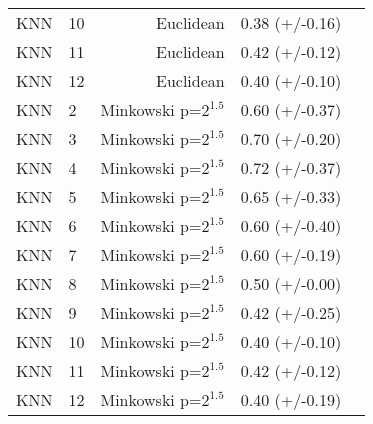 \documentclass{article}
\begin{document}
\begin{tabular}{llrll}
              KNN &         10 &              Euclidean &  0.38 (+/-0.16) \\
              KNN &         11 &              Euclidean &  0.42 (+/-0.12) \\
              KNN &         12 &              Euclidean &  0.40 (+/-0.10) \\
              KNN &          2 &  Minkowski p=$2^{1.5}$ &  0.60 (+/-0.37) \\
              KNN &          3 &  Minkowski p=$2^{1.5}$ &  0.70 (+/-0.20) \\
              KNN &          4 &  Minkowski p=$2^{1.5}$ &  0.72 (+/-0.37) \\
              KNN &          5 &  Minkowski p=$2^{1.5}$ &  0.65 (+/-0.33) \\
              KNN &          6 &  Minkowski p=$2^{1.5}$ &  0.60 (+/-0.40) \\
              KNN &          7 &  Minkowski p=$2^{1.5}$ &  0.60 (+/-0.19) \\
              KNN &          8 &  Minkowski p=$2^{1.5}$ &  0.50 (+/-0.00) \\
              KNN &          9 &  Minkowski p=$2^{1.5}$ &  0.42 (+/-0.25) \\
              KNN &         10 &  Minkowski p=$2^{1.5}$ &  0.40 (+/-0.10) \\
              KNN &         11 &  Minkowski p=$2^{1.5}$ &  0.42 (+/-0.12) \\
              KNN &         12 &  Minkowski p=$2^{1.5}$ &  0.40 (+/-0.19) \\
              \bottomrule
            \end{tabular}
\end{document}
